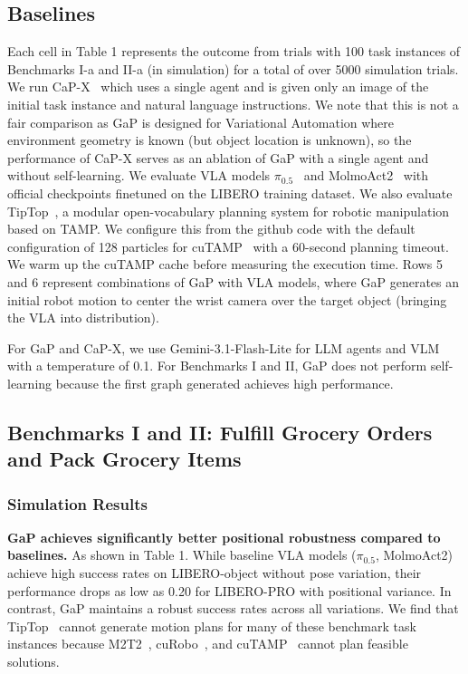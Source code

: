 \subsection{Baselines}
Each cell in Table 1 represents the outcome from trials with 100 task instances of Benchmarks I-a and II-a (in simulation) for a total of over 5000 simulation trials.  We run CaP-X~\cite{fu2026cap} which uses a single agent and is given only an image of the initial task instance and natural language instructions. We note that this is not a fair comparison as GaP is designed for Variational Automation where environment geometry is known (but object location is unknown), so the performance of CaP-X serves as an ablation of GaP with a single agent and without self-learning.  We evaluate VLA models $\pi_{0.5}$~\cite{black2025pi_} and MolmoAct2~\cite{fang2026molmoact2} with official checkpoints finetuned on the LIBERO training dataset. We also evaluate TipTop~\cite{shen2026tiptop}, a modular open-vocabulary planning system for robotic manipulation based on TAMP. We configure this from the github code with the default configuration of 128 particles for cuTAMP~\cite{shen2024differentiable} with a 60-second planning timeout.
We warm up the cuTAMP cache before measuring the execution time.  Rows 5 and 6 represent combinations of GaP with VLA models, where GaP generates an initial robot motion to center the wrist camera over the target object (bringing the VLA into distribution).

For GaP and CaP-X, we use Gemini-3.1-Flash-Lite for LLM agents and VLM with a temperature of 0.1.  
For Benchmarks I and II,  GaP does not perform self-learning because the first graph generated achieves high performance.



\subsection{Benchmarks I and II: Fulfill Grocery Orders and Pack Grocery Items}



\subsubsection{Simulation Results}
\textbf{GaP achieves significantly better positional robustness compared to baselines.} As shown in Table 1.   While baseline VLA models ($\pi_{0.5}$, MolmoAct2) achieve high success rates on LIBERO-object without pose variation, their performance drops as low as 0.20 for LIBERO-PRO with positional variance. In contrast, GaP maintains a robust success rates across all variations. We find that TipTop~\cite{shen2026tiptop} cannot generate motion plans for many of these benchmark task instances because M2T2~\cite{yuan2023m2t2}, cuRobo~\cite{sundaralingam2023curobo}, and cuTAMP~\cite{shen2024differentiable} cannot plan feasible solutions.

